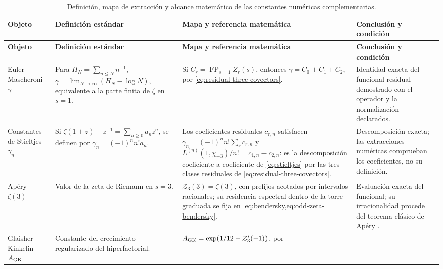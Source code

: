 \begingroup
\small
\fontsize{10pt}{11.2pt}\selectfont
\setlength{\LTpre}{0.5\baselineskip}
\setlength{\LTpost}{0.5\baselineskip}
\begin{longtable}{@{}>{\raggedright\arraybackslash}p{}
                    >{\raggedright\arraybackslash}p{}
                    >{\raggedright\arraybackslash}p{}
                    >{\raggedright\arraybackslash}p{}@{}}
\caption{Definici\'on, mapa de extracci\'on y alcance matem\'atico de las
constantes num\'ericas complementarias.}
\label{p3-83-c44-s1:tab:constantes-operadores-ontologia-rev11}\\
\toprule
\textbf{Objeto} & \textbf{Definici\'on est\'andar} &
\textbf{Mapa y referencia matem\'atica} & \textbf{Conclusi\'on y condici\'on}\\
\midrule
\endfirsthead
\toprule
\textbf{Objeto} & \textbf{Definici\'on est\'andar} &
\textbf{Mapa y referencia matem\'atica} & \textbf{Conclusi\'on y condici\'on}\\
\midrule
\endhead
Euler--Mascheroni \(\gamma\) &
Para \(H_N=\sum_{n\leq N}n^{-1}\),
\(\gamma=\lim_{N\to\infty}(H_N-\log N)\), equivalente a la parte finita de
\(\zeta\) en \(s=1\). &
Si \(C_r=\operatorname*{FP}_{s=1}Z_r(s)\), entonces
\(\gamma=C_0+C_1+C_2\), por
\eqref{eq:residual-three-covectors}. &
Identidad exacta del funcional residual demostrado con el operador y la
normalizaci\'on declarados.\\
Constantes de Stieltjes \(\gamma_n\) &
Si \(\zeta(1+z)-z^{-1}=\sum_{n\geq0}a_nz^n\), se definen por
\(\gamma_n=(-1)^n n!a_n\). &
Los coeficientes residuales \(c_{r,n}\) satisfacen
\(\gamma_n=(-1)^n n!\sum_r c_{r,n}\) y
\(L^{(n)}(1,\chi_{-3})/n!=c_{1,n}-c_{2,n}\): es la descomposición
coeficiente a coeficiente de \eqref{eq:stieltjes} por las tres clases
residuales de \eqref{eq:residual-three-covectors}. &
Descomposici\'on exacta; las extracciones num\'ericas comprueban los
coeficientes, no su definici\'on.\\
Ap\'ery \(\zeta(3)\) &
Valor de la zeta de Riemann en \(s=3\). &
\(\mathcal Z_3(3)=\zeta(3)\), con prefijos acotados por intervalos racionales;
su residencia espectral dentro de la torre graduada se fija en
\cref{eq:bendersky,eq:odd-zeta-bendersky}. &
Evaluaci\'on exacta del funcional; su irracionalidad procede del teorema
cl\'asico de Ap\'ery \cite{Apery1979}.\\
Glaisher--Kinkelin \(A_{\rm GK}\) &
Constante del crecimiento regularizado del hiperfactorial. &
\(A_{\rm GK}=\exp(1/12-\mathcal Z_3'(-1))\), por

\end{longtable}

